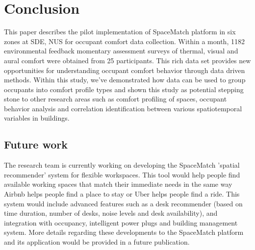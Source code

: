\documentclass[]{interact}
\theoremstyle{plain}%
\theoremstyle{definition}
\theoremstyle{remark}
\begin{document}
\section{Conclusion}
This paper describes the pilot implementation of SpaceMatch platform in six zones at SDE, NUS for occupant comfort data collection. Within a month, 1182 environmental feedback momentary assessment surveys of thermal, visual and aural comfort were obtained from 25 participants. This rich data set provides new opportunities for understanding occupant comfort behavior through data driven methods. Within this study, we've demonstrated how data can be used to group occupants into comfort profile types and shown this study as potential stepping stone to other research areas such as comfort profiling of spaces, occupant behavior analysis and correlation identification between various spatiotemporal variables in buildings. 

\subsection{Future work}
The research team is currently working on developing the SpaceMatch 'spatial recommender' system for flexible workspaces. This tool would help people find available working spaces that match their immediate needs in the same way Airbnb \textregistered helps people find a place to stay or Uber \textregistered helps people find a ride. This system would include advanced features such as a desk recommender (based on time duration, number of desks, noise levels and desk availability), and integration with occupancy, intelligent power plugs and building management system. More details regarding these developments to the SpaceMatch platform and its application would be provided in a future publication. 



\end{document}
